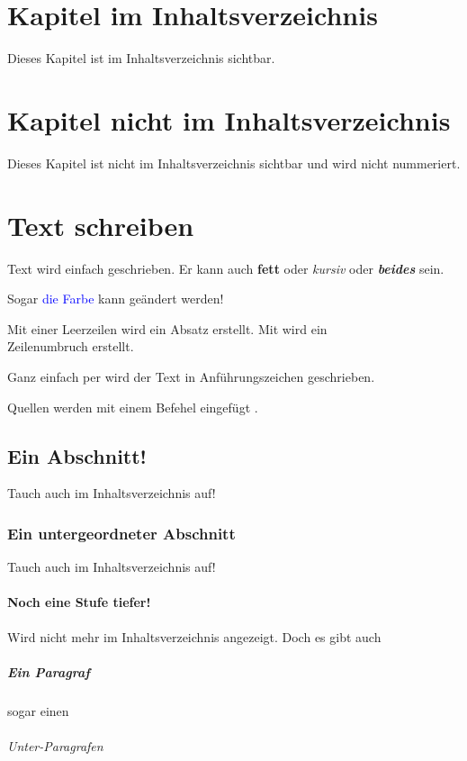 \chapter{Kapitel im Inhaltsverzeichnis}
Dieses Kapitel ist im Inhaltsverzeichnis sichtbar.

\chapter*{Kapitel nicht im Inhaltsverzeichnis}
Dieses Kapitel ist nicht im Inhaltsverzeichnis sichtbar und wird nicht nummeriert.

\chapter{Text schreiben}
Text wird einfach geschrieben.
Er kann auch \textbf{fett} oder \textit{kursiv} oder \textit{\textbf{beides}} sein.

Sogar \textcolor{blue}{die Farbe} kann geändert werden!

Mit einer Leerzeilen wird ein Absatz erstellt.
Mit \anfz{\textbackslash\textbackslash} wird ein\\
Zeilenumbruch erstellt.

Ganz einfach per  wird der Text in Anführungszeichen geschrieben.

Quellen werden mit einem  Befehel eingefügt \cite{Tietze2010}.

\section{Ein Abschnitt!}
Tauch auch im Inhaltsverzeichnis auf!
\subsection{Ein untergeordneter Abschnitt}
Tauch auch im Inhaltsverzeichnis auf!
\subsubsection{Noch eine Stufe tiefer!}
Wird nicht mehr im Inhaltsverzeichnis angezeigt.
Doch es gibt auch
\paragraph{Ein Paragraf} sogar einen
\subparagraph{Unter-Paragrafen}